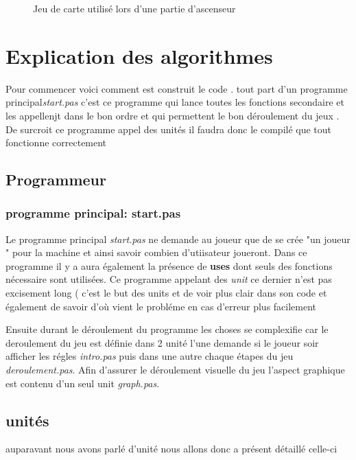 \documentclass[12pt]{report}
\begin{document}
\begin{itemize}
	\begin{figure}
	 \caption{Jeu de carte utilisé lors d'une partie d'ascenseur}
	\end{figure}
		

		
\clearpage

		
\section{Explication des algorithmes}
Pour commencer voici comment est construit le code . tout part d'un programme principal\textit{start.pas} c'est ce programme qui lance toutes les fonctions secondaire et  les appellenjt dans le bon ordre et  qui permettent le bon déroulement du jeux . De surcroit ce programme appel des unités il faudra donc le compilé que tout fonctionne correctement    
 \subsection{Programmeur}
  
   \subsubsection{programme principal: start.pas}
   Le programme principal \textit{start.pas} ne demande au joueur que de se crée "un joueur " pour la machine et ainsi savoir combien d'utiisateur joueront. Dans ce programme il y a aura également la présence de \textbf{uses} dont seuls des fonctions nécessaire sont utilisées. Ce programme appelant des \textit{unit} ce dernier n'est pas excisement long ( c'est le but des units et de voir plus clair dans son code et également de savoir  d'où vient le probléme en cas d'erreur plus facilement 
   
   Ensuite durant le déroulement du programme les choses se complexifie  car le deroulement  du jeu est définie dans 2 unité l'une demande si le joueur soir afficher les régles \textit{intro.pas}  puis dans une autre chaque étapes du jeu  \textit{deroulement.pas}. 
 Afin d'assurer le déroulement visuelle du jeu l'aspect graphique est contenu d'un seul unit \textit{graph.pas}.
   
   \subsection{unités}
    auparavant nous avons parlé d'unité nous allons donc a présent détaillé celle-ci

\end{itemize}
\end{document}
